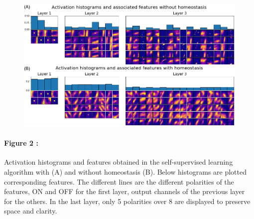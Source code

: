 \documentclass[12pt]{article}
\begin{document}
\begin{figure}
\vspace{-20pt}
\includegraphics[width=1.03\linewidth]{../notebooks/fig/layerz.png}
\vspace{-55pt}
\caption*
{
\label{fig:fig2}
}
\end{figure}

\paragraph*{Figure 2 : }
Activation histograms and features obtained in the self-supervised learning algorithm with (A) and without homeostasis (B). Below histograms are plotted corresponding features. The different lines are the different polarities of the features, ON and OFF for the first layer, output channels of the previous layer for the others. In the last layer, only 5 polarities over 8 are displayed to preserve space and clarity.
\end{document}
